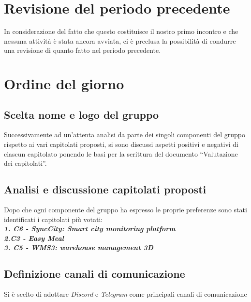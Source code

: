 \documentclass{article}
\begin{document}
\maketitle
\thispagestyle{fancy}
\tableofcontents
{}
\pagebreak

\flushleft

\section{Revisione del periodo precedente}
    In considerazione del fatto che questo costituisce il nostro primo incontro e che nessuna attività è stata ancora avviata, ci è preclusa la possibilità di condurre una revisione di quanto fatto nel periodo precedente.

\section{Ordine del giorno}

    \subsection{Scelta nome e logo del gruppo}
        Successivamente ad un’attenta analisi da parte dei singoli componenti del gruppo rispetto
        ai vari capitolati proposti, si sono discussi aspetti positivi e negativi di ciascun capitolato ponendo le basi per la scrittura del documento “Valutazione dei capitolati”. \subsection{Analisi e discussione capitolati proposti}
        Dopo che ogni componente del gruppo ha espresso le proprie preferenze sono stati identificati i capitolati più votati:\\
        \textbf{\textit{1. C6 - SyncCity: Smart city monitoring platform\\2.C3 - Easy Meal\\3. C5 - WMS3: warehouse management 3D}}

    \subsection{Definizione canali di comunicazione}
        Si è scelto di adottare \textit{Discord} e \textit{Telegram} come principali canali di comunicazione
\end{document}
